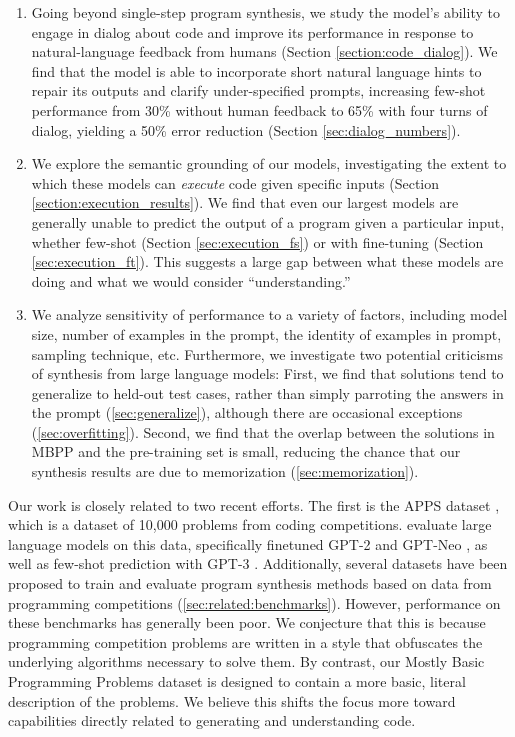 \begin{enumerate}
    \item Going beyond single-step program synthesis, we study the model's ability to engage in dialog about code and improve its performance in response to natural-language feedback from humans (Section \ref{section:code_dialog}).
    We find that the model is able to incorporate short natural language hints to repair its outputs and clarify under-specified prompts, increasing few-shot performance from 30\% without human feedback to 65\% with four turns of dialog, yielding a 50\% error reduction (Section \ref{sec:dialog_numbers}).

    \item We explore the semantic grounding of our models, investigating the extent to which these models can \textit{execute} code given specific inputs (Section \ref{section:execution_results}).
    We find that even our largest models are generally unable to predict the output of a program given a particular input, whether few-shot (Section \ref{sec:execution_fs}) or with fine-tuning (Section \ref{sec:execution_ft}). This suggests a large gap between what these models are doing and what we would consider ``understanding.''

    \item We analyze sensitivity of performance to a variety of factors, including model size, number of examples in the prompt, the identity of examples in prompt, sampling technique, etc. Furthermore, we investigate two potential criticisms of synthesis from large language models: First, we find that solutions tend to generalize to held-out test cases, rather than simply parroting the answers in the prompt (\autoref{sec:generalize}), 
    although there are occasional exceptions (\autoref{sec:overfitting}).  Second, we find that the overlap between the solutions in MBPP and the pre-training set is small, reducing the chance that our synthesis results are due to memorization (\autoref{sec:memorization}). 
\end{enumerate}

Our work is closely related to two recent efforts. The first is the APPS dataset \citep{apps}, which is a dataset of 10,000 problems from coding competitions. \citet{apps} evaluate large language models on this data, specifically finetuned GPT-2 \citep{GPT2} and GPT-Neo \citep{gpt-neo}, as well as few-shot prediction with GPT-3 \citep{GPT3}. Additionally, several datasets have been proposed to train and evaluate program synthesis methods based on data from programming competitions (\autoref{sec:related:benchmarks}).
However, performance on these benchmarks has generally been poor. We conjecture that this is because programming competition problems are written in a style that obfuscates the underlying algorithms necessary to solve them. By contrast, our Mostly Basic Programming Problems dataset is designed to contain a more basic, literal description of the problems. We believe this shifts the focus more toward capabilities directly related to generating and understanding code.

